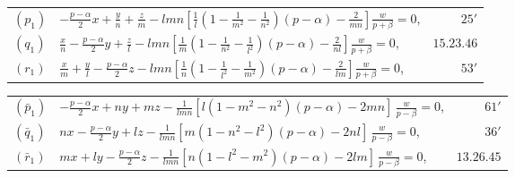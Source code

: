 \documentclass[12pt,a4paper]{article}
\begin{document}
\begin{center}
\begin{tabular}{@{}l@{\qquad}l@{\qquad}r@{}}
$(p_1)$ & $\displaystyle -\frac{p - \alpha}{2}x + \frac{y}{n} + \frac{z}{m} - lmn\left[\frac{1}{l}\left(1 - \frac{1}{m^2} - \frac{1}{n^2}\right)(p - \alpha) - \frac{2}{mn}\right]\frac{w}{p + \beta} = 0$, & $25'$ \\[4pt]
$(q_1)$ & $\displaystyle \frac{x}{n} - \frac{p - \alpha}{2}y + \frac{z}{l} - lmn\left[\frac{1}{m}\left(1 - \frac{1}{n^2} - \frac{1}{l^2}\right)(p - \alpha) - \frac{2}{nl}\right]\frac{w}{p + \beta} = 0$, & $15.23.46$ \\[4pt]
$(r_1)$ & $\displaystyle \frac{x}{m} + \frac{y}{l} - \frac{p - \alpha}{2}z - lmn\left[\frac{1}{n}\left(1 - \frac{1}{l^2} - \frac{1}{m^2}\right)(p - \alpha) - \frac{2}{lm}\right]\frac{w}{p + \beta} = 0$, & $53'$
\end{tabular}
\end{center}

\begin{center}
\begin{tabular}{@{}l@{\qquad}l@{\qquad}r@{}}
$(\bar{p}_1)$ & $\displaystyle -\frac{p - \alpha}{2}x + ny + mz - \frac{1}{lmn}[l(1 - m^2 - n^2)(p - \alpha) - 2mn]\,\frac{w}{p - \beta} = 0$, & $61'$ \\[4pt]
$(\bar{q}_1)$ & $\displaystyle nx - \frac{p - \alpha}{2}y + lz - \frac{1}{lmn}[m(1 - n^2 - l^2)(p - \alpha) - 2nl]\,\frac{w}{p - \beta} = 0$, & $36'$ \\[4pt]
$(\bar{r}_1)$ & $\displaystyle mx + ly - \frac{p - \alpha}{2}z - \frac{1}{lmn}[n(1 - l^2 - m^2)(p - \alpha) - 2lm]\,\frac{w}{p - \beta} = 0$, & $13.26.45$
\end{tabular}
\end{center}

\medskip
\end{document}
